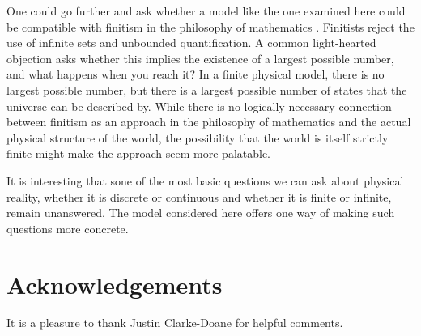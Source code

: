 \documentclass[aps,prd,twocolumn,nofootinbib,notitlepage]{revtex4-1}
\begin{document}
One could go further and ask whether a model like the one examined here could be compatible with finitism in the philosophy of mathematics \cite{ye2011strict}.
Finitists reject the use of infinite sets and unbounded quantification.
A common light-hearted objection asks whether this implies the existence of a largest possible number, and what happens when you reach it?
In a finite physical model, there is no largest possible number, but there is a largest possible number of states that the universe can be described by. 
While there is no logically necessary connection between finitism as an approach in the philosophy of mathematics and the actual physical structure of the world, the possibility that the world is itself strictly finite might make the approach seem more palatable.

It is interesting that sone of the most basic questions we can ask about physical reality, whether it is discrete or continuous and whether it is finite or infinite, remain unanswered.
The model considered here offers one way of making such questions more concrete.


\section*{Acknowledgements}
It is a pleasure to thank Justin Clarke-Doane for helpful comments.




\end{document}
